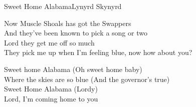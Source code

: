 \begin{song}{Sweet Home Alabama}{Lynyrd Skynyrd}


\begin{guitar}
Now Muscle Shoals has got the Swappers\\
And they've been known to pick a song or two\\
Lord they get me off so much\\
They pick me up when I'm feeling blue, now how about you?\\
\end{guitar}


\begin{guitar}
Sweet home Alabama (Oh sweet home baby)\\
Where the skies are so blue (And the governor's true)\\
Sweet Home Alabama (Lordy)\\
Lord, I'm coming home to you\\
\end{guitar}
\end{song}
